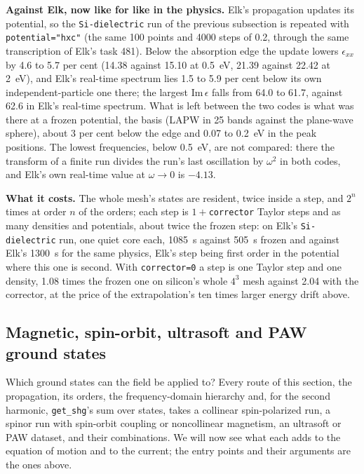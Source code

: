 \documentclass[11pt,a4paper]{article}
\newcommand{\code}[1]{\texttt{\small #1}}
\begin{document}
\textbf{Against Elk, now like for like in the physics.} Elk's propagation updates
its potential, so the \code{Si-dielectric} run of the previous subsection is
repeated with \code{potential="hxc"} (the same 100 points and 4000 steps of 0.2,
through the same transcription of Elk's task 481). Below the absorption edge the
update lowers $\epsilon_{xx}$ by 4.6 to 5.7 per cent (14.38 against 15.10 at 0.5~eV,
21.39 against 22.42 at 2~eV), and Elk's real-time spectrum lies 1.5 to 5.9 per cent
below its own independent-particle one there; the largest $\mathrm{Im}\,\epsilon$ falls
from 64.0 to 61.7, against 62.6 in Elk's real-time spectrum. What is left between
the two codes is what was there at a frozen potential, the basis (LAPW in 25
bands against the plane-wave sphere), about 3 per cent below the edge and
0.07 to 0.2~eV in the peak positions. The lowest frequencies, below 0.5~eV, are
not compared: there the transform of a finite run divides the run's last
oscillation by $\omega^2$ in both codes, and Elk's own real-time value at
$\omega\to0$ is $-4.13$.

\textbf{What it costs.} The whole mesh's states are resident, twice inside a
step, and $2^n$ times at order $n$ of the orders; each step is $1+$\code{corrector}
Taylor steps and as many densities and potentials, about twice the frozen
step: on Elk's \code{Si-dielectric} run, one quiet core each, 1085~s against
505~s frozen and against Elk's 1300~s for the same physics, Elk's step being first
order in the potential where this one is second. With \code{corrector=0} a step is one Taylor step and one density, 1.08
times the frozen one on silicon's whole $4^3$ mesh against 2.04 with the corrector,
at the price of the extrapolation's ten times larger energy drift above.

\subsection{Magnetic, spin-orbit, ultrasoft and PAW ground states}

Which ground states can the field be applied to? Every route of this section,
the propagation, its orders, the frequency-domain hierarchy and, for the second
harmonic, \code{get\_shg}'s sum over states, takes a collinear spin-polarized
run, a spinor run with spin-orbit coupling or noncollinear magnetism, an
ultrasoft or PAW dataset, and their combinations. We will now see what each adds
to the equation of motion and to the current; the entry points and their
arguments are the ones above.
\end{document}

